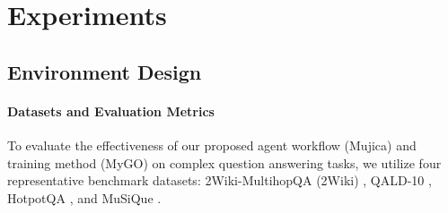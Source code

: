 \section{Experiments}


\subsection{Environment Design}
\paragraph{Datasets and Evaluation Metrics}
To evaluate the effectiveness of our proposed agent workflow (Mujica) and training method (MyGO) on complex question answering tasks, we utilize four representative benchmark datasets: 2Wiki-MultihopQA (2Wiki) \citep{ho2020constructing}, QALD-10 \citep{QALD-10}, HotpotQA \citep{yang2018hotpotqa}, and MuSiQue \citep{trivedi2021musique}.

